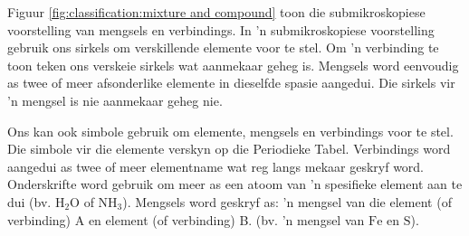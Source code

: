 \label{m38708*eip-487} Figuur \ref{fig:classification:mixture and compound} toon die submikroskopiese voorstelling van mengsels en verbindings. In 'n submikroskopiese voorstelling gebruik ons sirkels om verskillende elemente voor te stel. Om 'n verbinding te toon teken ons verskeie sirkels wat aanmekaar geheg is. Mengsels word eenvoudig as twee of meer afsonderlike elemente in dieselfde spasie aangedui. Die sirkels vir 'n mengsel is nie aanmekaar geheg nie.\par 
\label{m38708*id0124}Ons kan ook simbole gebruik om elemente, mengsels en verbindings voor te stel. Die simbole vir die elemente verskyn op die Periodieke Tabel. Verbindings word aangedui as twee of meer elementname wat reg langs mekaar geskryf word. Onderskrifte word gebruik om meer as een atoom van 'n spesifieke element aan te dui (bv. $\text{H}{}_{2}\text{O}$ of $\text{NH}_{3}$). Mengsels word geskryf as: 'n mengsel van die element (of verbinding) A en element (of verbinding) B. (bv. 'n mengsel van $\text{Fe}$ en $\text{S}$).
\label{m38708*eip-524} \vspace{-.5cm}
